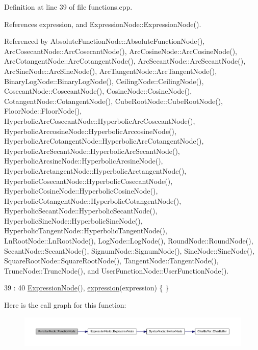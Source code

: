 Definition at line 39 of file functions.\+cpp.



References expression, and Expression\+Node\+::\+Expression\+Node().



Referenced by Absolute\+Function\+Node\+::\+Absolute\+Function\+Node(), Arc\+Cosecant\+Node\+::\+Arc\+Cosecant\+Node(), Arc\+Cosine\+Node\+::\+Arc\+Cosine\+Node(), Arc\+Cotangent\+Node\+::\+Arc\+Cotangent\+Node(), Arc\+Secant\+Node\+::\+Arc\+Secant\+Node(), Arc\+Sine\+Node\+::\+Arc\+Sine\+Node(), Arc\+Tangent\+Node\+::\+Arc\+Tangent\+Node(), Binary\+Log\+Node\+::\+Binary\+Log\+Node(), Ceiling\+Node\+::\+Ceiling\+Node(), Cosecant\+Node\+::\+Cosecant\+Node(), Cosine\+Node\+::\+Cosine\+Node(), Cotangent\+Node\+::\+Cotangent\+Node(), Cube\+Root\+Node\+::\+Cube\+Root\+Node(), Floor\+Node\+::\+Floor\+Node(), Hyperbolic\+Arc\+Cosecant\+Node\+::\+Hyperbolic\+Arc\+Cosecant\+Node(), Hyperbolic\+Arccosine\+Node\+::\+Hyperbolic\+Arccosine\+Node(), Hyperbolic\+Arc\+Cotangent\+Node\+::\+Hyperbolic\+Arc\+Cotangent\+Node(), Hyperbolic\+Arc\+Secant\+Node\+::\+Hyperbolic\+Arc\+Secant\+Node(), Hyperbolic\+Arcsine\+Node\+::\+Hyperbolic\+Arcsine\+Node(), Hyperbolic\+Arctangent\+Node\+::\+Hyperbolic\+Arctangent\+Node(), Hyperbolic\+Cosecant\+Node\+::\+Hyperbolic\+Cosecant\+Node(), Hyperbolic\+Cosine\+Node\+::\+Hyperbolic\+Cosine\+Node(), Hyperbolic\+Cotangent\+Node\+::\+Hyperbolic\+Cotangent\+Node(), Hyperbolic\+Secant\+Node\+::\+Hyperbolic\+Secant\+Node(), Hyperbolic\+Sine\+Node\+::\+Hyperbolic\+Sine\+Node(), Hyperbolic\+Tangent\+Node\+::\+Hyperbolic\+Tangent\+Node(), Ln\+Root\+Node\+::\+Ln\+Root\+Node(), Log\+Node\+::\+Log\+Node(), Round\+Node\+::\+Round\+Node(), Secant\+Node\+::\+Secant\+Node(), Signum\+Node\+::\+Signum\+Node(), Sine\+Node\+::\+Sine\+Node(), Square\+Root\+Node\+::\+Square\+Root\+Node(), Tangent\+Node\+::\+Tangent\+Node(), Trunc\+Node\+::\+Trunc\+Node(), and User\+Function\+Node\+::\+User\+Function\+Node().


\begin{DoxyCode}
39                                                      :
40     \hyperlink{classExpressionNode_adc8888de5329d356224c8a93f3ce2b75}{ExpressionNode}(), \hyperlink{classFunctionNode_ad7577b179a1937aaf8a0058bb5b546dc}{expression}(expression) \{ \}
\end{DoxyCode}


Here is the call graph for this function\+:\nopagebreak
\begin{figure}[H]
\begin{center}
\leavevmode
\includegraphics[width=350pt]{classFunctionNode_a41cb7db0162ffbec0902bd8ff7ea435f_cgraph}
\end{center}
\end{figure}





